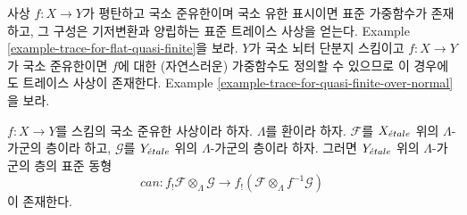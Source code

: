 \medskip\noindent
사상 $f : X \to Y$가 평탄하고 국소 준유한이며 국소 유한 표시이면
표준 가중함수가 존재하고, 그 구성은 기저변환과 양립하는 표준 트레이스
사상을 얻는다. Example \ref{example-trace-for-flat-quasi-finite}을 보라.
$Y$가 국소 뇌터 단분지 스킴이고 $f : X \to Y$가 국소 준유한이면
$f$에 대한 (자연스러운) 가중함수도 정의할 수 있으므로 이 경우에도
트레이스 사상이 존재한다. Example
\ref{example-trace-for-quasi-finite-over-normal}을 보라.

\begin{lemma}
\label{lemma-f-shriek-projection}
$f : X \to Y$를 스킴의 국소 준유한 사상이라 하자.
$\Lambda$를 환이라 하자. $\mathcal{F}$를 $X_{\acute{e}tale}$ 위의
$\Lambda$-가군의 층이라 하고,
$\mathcal{G}$를 $Y_{\acute{e}tale}$ 위의 $\Lambda$-가군의 층이라 하자.
그러면 $Y_{\acute{e}tale}$ 위의 $\Lambda$-가군의 층의 표준 동형
$$
can :
f_!\mathcal{F} \otimes_\Lambda \mathcal{G}
\longrightarrow
f_!(\mathcal{F} \otimes_\Lambda f^{-1}\mathcal{G})
$$
이 존재한다.
\end{lemma}

